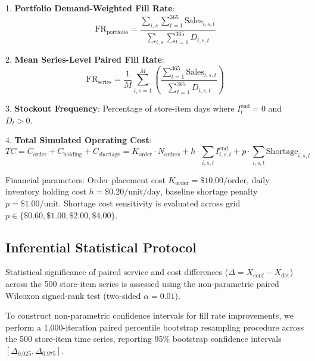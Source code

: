 1. \textbf{Portfolio Demand-Weighted Fill Rate}:
\begin{equation}
\text{FR}_{\text{portfolio}} = \frac{\sum_{i,s} \sum_{t=1}^{365} \text{Sales}_{i,s,t}}{\sum_{i,s} \sum_{t=1}^{365} D_{i,s,t}}
\end{equation}

2. \textbf{Mean Series-Level Paired Fill Rate}:
\begin{equation}
\overline{\text{FR}}_{\text{series}} = \frac{1}{M} \sum_{i,s=1}^M \left( \frac{\sum_{t=1}^{365} \text{Sales}_{i,s,t}}{\sum_{t=1}^{365} D_{i,s,t}} \right)
\end{equation}

3. \textbf{Stockout Frequency}: Percentage of store-item days where $I_t^{\text{end}} = 0$ and $D_t > 0$.

4. \textbf{Total Simulated Operating Cost}:
\begin{equation}
TC = C_{\text{order}} + C_{\text{holding}} + C_{\text{shortage}} = K_{\text{order}} \cdot N_{\text{orders}} + h \cdot \sum_{i,s,t} I_{i,s,t}^{\text{end}} + p \cdot \sum_{i,s,t} \text{Shortage}_{i,s,t}
\end{equation}

Financial parameters: Order placement cost $K_{\text{order}} = \$10.00/\text{order}$, daily inventory holding cost $h = \$0.20/\text{unit/day}$, baseline shortage penalty $p = \$1.00/\text{unit}$. Shortage cost sensitivity is evaluated across grid $p \in \{\$0.60, \$1.00, \$2.00, \$4.00\}$.

\subsection{Inferential Statistical Protocol}
Statistical significance of paired service and cost differences ($\Delta = X_{\text{conf}} - X_{\text{det}}$) across the 500 store-item series is assessed using the non-parametric paired Wilcoxon signed-rank test (two-sided $\alpha = 0.01$). 

To construct non-parametric confidence intervals for fill rate improvements, we perform a 1,000-iteration paired percentile bootstrap resampling procedure across the 500 store-item time series, reporting 95\% bootstrap confidence intervals $[ \Delta_{0.025}, \Delta_{0.975} ]$.
